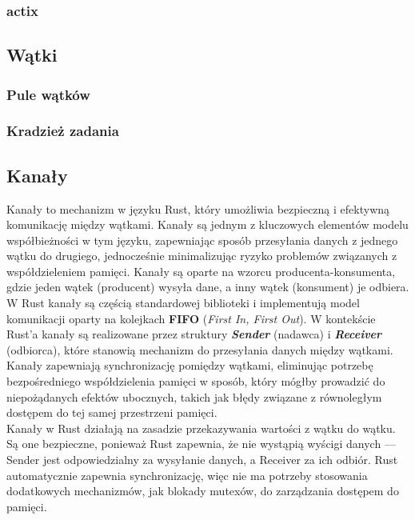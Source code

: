 \subsubsection{actix}
\subsection{Wątki}
\subsubsection{Pule wątków }
\subsubsection{Kradzież zadania }
\subsection{Kanały}

Kanały  to mechanizm w języku Rust, który umożliwia bezpieczną i efektywną komunikację między wątkami. Kanały są jednym z kluczowych elementów modelu współbieżności w tym języku, zapewniając sposób przesyłania danych z jednego wątku do drugiego, jednocześnie minimalizując ryzyko problemów związanych z współdzieleniem pamięci. Kanały są oparte na wzorcu producenta-konsumenta, gdzie jeden wątek (producent) wysyła dane, a inny wątek (konsument) je odbiera.
\\

W Rust kanały są częścią standardowej biblioteki i implementują model komunikacji oparty na kolejkach \textbf{FIFO} (\textit{First In, First Out}). W kontekście Rust'a kanały są realizowane przez struktury \textbf{\textit{Sender}} (nadawca) i \textbf{\textit{Receiver}} (odbiorca), które stanowią mechanizm do przesyłania danych między wątkami. Kanały zapewniają synchronizację pomiędzy wątkami, eliminując potrzebę bezpośredniego współdzielenia pamięci w sposób, który mógłby prowadzić do niepożądanych efektów ubocznych, takich jak błędy związane z równoległym dostępem do tej samej przestrzeni pamięci.
\\

Kanały w Rust działają na zasadzie przekazywania wartości z wątku do wątku. Są one bezpieczne, ponieważ Rust zapewnia, że nie wystąpią wyścigi danych — Sender jest odpowiedzialny za wysyłanie danych, a Receiver za ich odbiór. Rust automatycznie zapewnia synchronizację, więc nie ma potrzeby stosowania dodatkowych mechanizmów, jak blokady mutexów, do zarządzania dostępem do pamięci.

